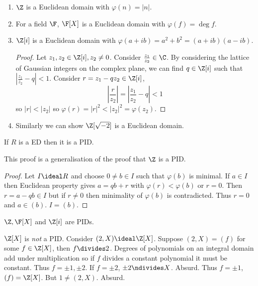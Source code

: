 \documentclass[a4paper]{article}
\theoremstyle{definition}
\begin{document}
\begin{eg}\leavevmode
  \begin{enumerate}
  \item \(\Z\) is a Euclidean domain with \(\varphi(n) = |n|\).
  \item For a field \(\F\), \(\F[X]\) is a Euclidean domain with \(\varphi(f) = \deg f\).
  \item \(\Z[i]\) is a Euclidean domain with \(\varphi(a + ib) = a^2 + b^2 = (a + ib)(a - ib)\).

    \begin{proof}
      Let \(z_1, z_2 \in \Z[i], z_2 \neq 0\). Consider \(\frac{z_1}{z_2} \in \C\). By considering the lattice of Gaussian integers on the complex plane, we can find \(q \in \Z[i]\) such that \(\left|\frac{z_1}{z_2} - q \right| < 1\). Consider \(r = z_1 - qz_2 \in \Z[i]\),
      \[
        \left| \frac{r}{z_2} \right| = \left| \frac{z_1}{z_2} - q \right| < 1
      \]
      so \(|r| < |z_2|\) so \(\varphi(r) = |r|^2 < |z_2|^2 = \varphi(z_2)\).
    \end{proof}
  \item Similarly we can show \(\Z[\sqrt{-2}]\) is a Euclidean domain.
  \end{enumerate}
\end{eg}

\begin{proposition}
  If \(R\) is a ED then it is a PID.
\end{proposition}

This proof is a generalisation of the proof that \(\Z\) is a PID.

\begin{proof}
  Let \(I \ideal R\) and choose \(0 \neq b \in I\) such that \(\varphi(b)\) is minimal. If \(a \in I\) then Euclidean property gives \(a = qb + r\) with \(\varphi(r) < \varphi(b)\) or \(r = 0\). Then \(r = a - qb \in I\) but if \(r \neq 0\) then minimality of \(\varphi(b)\) is contradicted. Thus \(r = 0\) and \(a \in (b)\). \(I = (b)\).
\end{proof}

\begin{eg}
  \(\Z, \F[X]\) and \(\Z[i]\) are PIDs.
\end{eg}

\begin{eg}
  \(\Z[X]\) is \emph{not} a PID. Consider \((2, X) \ideal \Z[X]\). Suppose \((2, X) = (f)\) for some \(f \in \Z[X]\), then \(f \divides 2\). Degrees of polynomials on an integral domain add under multiplication so if \(f\) divides a constant polynomial it must be constant. Thus \(f = \pm 1, \pm 2\). If \(f = \pm 2\), \(\pm 2 \ndivides X\). Absurd. Thus \(f = \pm 1\), \((f) = \Z[X]\). But \(1 \neq (2, X)\). Absurd.
\end{eg}
\end{document}
